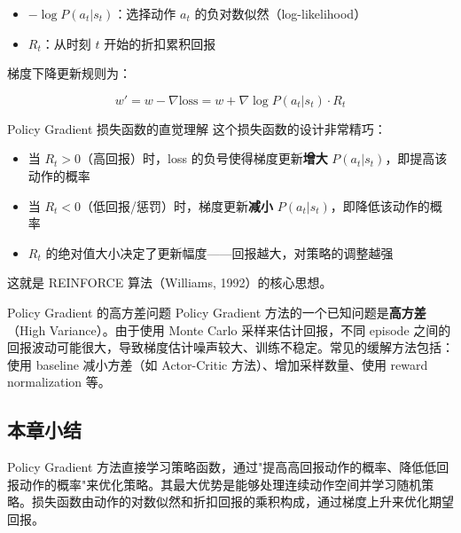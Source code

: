 \begin{itemize}
    \item $-\log P(a_t | s_t)$：选择动作 $a_t$ 的负对数似然（log-likelihood）
    \item $R_t$：从时刻 $t$ 开始的折扣累积回报
\end{itemize}

梯度下降更新规则为：

$$w' = w - \nabla \text{loss} = w + \nabla \log P(a_t | s_t) \cdot R_t$$

\begin{importantbox}{Policy Gradient 损失函数的直觉理解}
这个损失函数的设计非常精巧：
\begin{itemize}
    \item 当 $R_t > 0$（高回报）时，loss 的负号使得梯度更新\textbf{增大} $P(a_t|s_t)$，即提高该动作的概率
    \item 当 $R_t < 0$（低回报/惩罚）时，梯度更新\textbf{减小} $P(a_t|s_t)$，即降低该动作的概率
    \item $R_t$ 的绝对值大小决定了更新幅度------回报越大，对策略的调整越强
\end{itemize}
这就是 REINFORCE 算法（Williams, 1992）的核心思想。
\end{importantbox}

\begin{warningbox}{Policy Gradient 的高方差问题}
Policy Gradient 方法的一个已知问题是\textbf{高方差}（High Variance）。由于使用 Monte Carlo 采样来估计回报，不同 episode 之间的回报波动可能很大，导致梯度估计噪声较大、训练不稳定。常见的缓解方法包括：使用 baseline 减小方差（如 Actor-Critic 方法）、增加采样数量、使用 reward normalization 等。
\end{warningbox}

\subsection{本章小结}

Policy Gradient 方法直接学习策略函数，通过"提高高回报动作的概率、降低低回报动作的概率"来优化策略。其最大优势是能够处理连续动作空间并学习随机策略。损失函数由动作的对数似然和折扣回报的乘积构成，通过梯度上升来优化期望回报。



